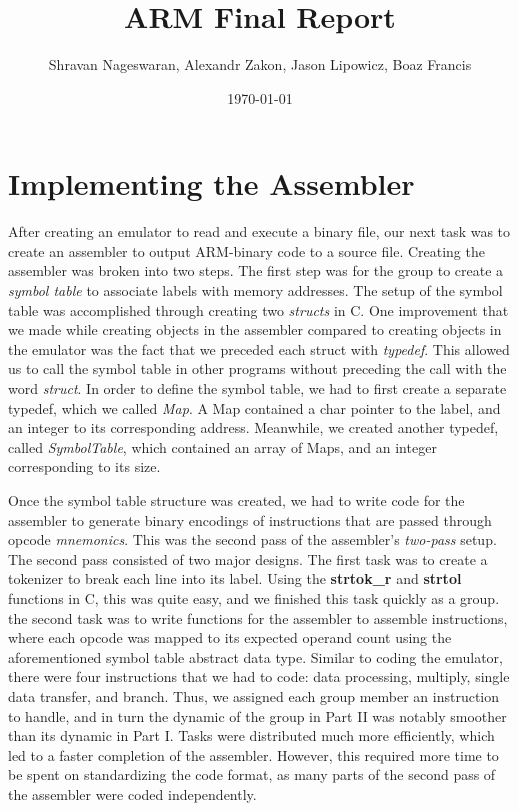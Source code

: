 \documentclass[11pt]{article}
\begin{document}
\title{\textbf{ARM Final Report}}
\author{Shravan Nageswaran, Alexandr Zakon, Jason Lipowicz, Boaz Francis}
\date{\today}

\maketitle

\vspace{0.2in}

\section{Implementing the Assembler}

After creating an emulator to read and execute a binary file, our next task was to create an assembler to output ARM-binary code to a source file. Creating the assembler was broken into two steps. The first step was for the group to create a \emph{symbol table} to associate labels with memory addresses. The setup of the symbol table was accomplished through creating two \emph{structs} in C. One improvement that we made while creating objects in the assembler compared to creating objects in the emulator was the fact that we preceded each struct with \emph{typedef}. This allowed us to call the symbol table in other programs without preceding the call with the word \emph{struct}. In order to define the symbol table, we had to first create a separate typedef, which we called \emph{Map}. A Map contained a char pointer to the label, and an integer to its corresponding address. Meanwhile, we created another typedef, called \emph{SymbolTable}, which contained an array of Maps, and an integer corresponding to its size.

\vspace{0.2in}

Once the symbol table structure was created, we had to write code for the assembler to generate binary encodings of instructions that are passed through opcode \emph{mnemonics}. This was the second pass of the assembler's \emph{two-pass} setup. The second pass consisted of two major designs. The first task was to create a tokenizer to break each line into its label. Using the \textbf{strtok\_r} and \textbf{strtol} functions in C, this was quite easy, and we finished this task quickly as a group. the second task was to write functions for the assembler to assemble instructions, where each opcode was mapped to its expected operand count using the aforementioned symbol table abstract data type. Similar to coding the emulator, there were four instructions that we had to code: data processing, multiply, single data transfer, and branch. Thus, we assigned each group member an instruction to handle, and in turn the dynamic of the group in Part II was notably smoother than its dynamic in Part I. Tasks were distributed much more efficiently, which led to a faster completion of the assembler. However, this required more time to be spent on standardizing the code format, as many parts of the second pass of the assembler were coded independently.
\end{document}
